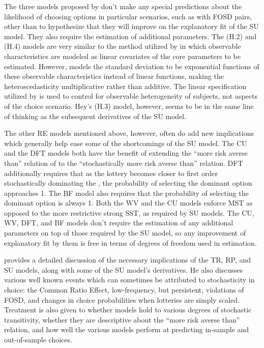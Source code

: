 \documentclass[../main.tex]{subfiles}
\begin{document}
The three models proposed by \textcite{Hey1995} don't make any special predictions about the likelihood of choosing options in particular scenarios, such as with FOSD pairs, other than to hypothesize that they will improve on the explanatory fit of the SU model.
They also require the estimation of additional parameters.
The (H.2) and (H.4) models are very similar to the method utilized by \textcite[142]{Harrison2008a} in which observable characteristics are modeled as linear covariates of the core parameters to be estimated.
However, \textcite{Hey1995} models the standard deviation to be exponential functions of these observable characteristics instead of linear functions, making the heteroscedasticity multiplicative rather than additive.
The linear specification utilized by \textcite{Harrison2008a} is used to control for observable heterogeneity of subjects, not aspects of the choice scenario.
Hey's (H.3) model, however, seems to be in the same line of thinking as the subsequent derivatives of the SU model.

The other RE models mentioned above, however, often do add new implications which generally help ease some of the shortcomings of the SU model.
The CU and the DFT models both have the benefit of extending the \enquote{more risk averse than} relation of \textcite{Pratt1964} to the \enquote{stochastically more risk averse than} relation.
DFT additionally requires that as the lottery becomes closer to first order stochastically dominating the {\CE}, the probability of selecting the dominant option approaches 1.
The BF model also requires that the probability of selecting the dominant option is always 1.
Both the WV and the CU models enforce MST as opposed to the more restrictive strong SST,  as required by SU models.
The CU, WV, DFT, and BF models don't require the estimation of any additional parameters on top of those required by the SU model, so any improvement of explanatory fit by them is free in terms of degrees of freedom used in estimation.

\textcite{Wilcox2008} provides a detailed discussion of the necessary implications of the TR, RP,  and SU models, along with some of the SU model's derivatives.
He also discusses various well known events which can sometimes be attributed to stochasticity in choice: the Common Ratio Effect, low-frequency, but persistent, violations of FOSD, and changes in choice probabilities when lotteries are simply scaled.{\footnotemark}
Treatment is also given to whether models hold to various degrees of stochastic transitivity, whether they are descriptive about the \enquote{more risk averse than} relation, and how well the various models perform at predicting in-sample and out-of-sample choices.{\footnotemark}
\end{document}
